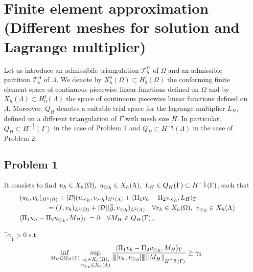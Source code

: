 \section{Finite element approximation (Different meshes for solution and Lagrange multiplier)}
Let us introduce an admissibile triangulation $\mathcal{T}^{\Omega}_h$ of $\Omega$ and an admissible partition $\mathcal{T}^{\Lambda}_{h}$ of $\Lambda$. We denote by $X^0_h(\Omega)\subset H^1_0(\Omega)$ the conforming finite element space of continuous piecewise linear functions defined on $\Omega$ and by $X_{h}(\Lambda)\subset H^1_0(\Lambda)$ the space of continuous piecewise linear functions defined on $\Lambda$. Moreover, $Q_H$ denotes a suitable trial space for the lagrange multiplier $L_H$, defined on a different triangulation of $\Gamma$ with mesh size $H$. In particular, $Q_H \subset H^{-\frac12}(\Gamma )$ in the case of Problem 1 and $Q_H \subset H^{-\frac12}(\Lambda)$ in the case of Problem 2. 

\subsection{Problem 1}

It consists to find $u_h \in X_h(\Omega) ,\ {\ud}_h \in X_h(\Lambda) , \ L_H \in Q_H(\Gamma) \subset H^{-\frac12}(\Gamma )$, such that
\begin{subequations}\label{eq:red_dirneu}
\begin{align}
&(u_h,v_h)_{H^1(\Omega)} + |{\cal D}| ({\ud}_h,{\vd}_h)_{H^1(\Lambda)} 
+ \langle \Pi_1 v_h  - \Pi_2 {\vd}_h, L_H \rangle_\Gamma 
\\
\nonumber
&\qquad\qquad= (f,v_h)_{L^2(\Omega)} + |{\cal D}|(\avrd{g},{\vd}_h)_{L^2(\Lambda)}
\quad \forall v_h \in X_h(\Omega), \ {\vd}_h \in X_h(\Lambda)
\\
&   \langle \Pi_1 u_h - \Pi_2 {\ud}_h , M_H \rangle_\Gamma = 0
\quad \forall M_H \in Q_H(\Gamma)\,,
\end{align}
\end{subequations}

\begin{theorem}
$\exists \gamma _1 >0$ s.t.
\begin{equation}\label{inf_sup_discrete_prob1}
\inf_{M_H \in Q_H(\Gamma)} 
\sup_{\substack{v_h \in X_h(\Omega),\\ {\vd}_h \in X_h(\Lambda)}} \frac{ \langle \Pi_1 v_h - \Pi_2 {\vd}_h, M_H \rangle _{\Gamma}} {\vertiii{[v_h, {\vd}_h]} \|M_H\|_{H^{-\frac 12 }(\Gamma)}} 
\geq \gamma _1. 
\end{equation}
\end{theorem}

